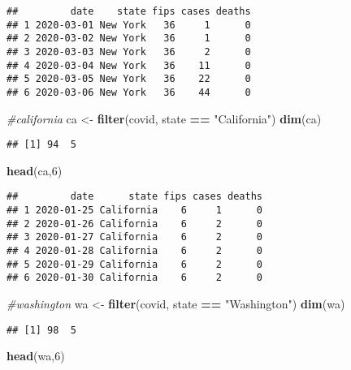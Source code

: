 \documentclass[]{article}
\newenvironment{Shaded}{\begin{snugshade}}{\end{snugshade}}
\newcommand{\CommentTok}[1]{\textcolor[rgb]{0.56,0.35,0.01}{\textit{#1}}}
\newcommand{\DecValTok}[1]{\textcolor[rgb]{0.00,0.00,0.81}{#1}}
\newcommand{\KeywordTok}[1]{\textcolor[rgb]{0.13,0.29,0.53}{\textbf{#1}}}
\newcommand{\NormalTok}[1]{#1}
\newcommand{\OperatorTok}[1]{\textcolor[rgb]{0.81,0.36,0.00}{\textbf{#1}}}
\newcommand{\StringTok}[1]{\textcolor[rgb]{0.31,0.60,0.02}{#1}}
\begin{document}
\begin{verbatim}
##         date    state fips cases deaths
## 1 2020-03-01 New York   36     1      0
## 2 2020-03-02 New York   36     1      0
## 3 2020-03-03 New York   36     2      0
## 4 2020-03-04 New York   36    11      0
## 5 2020-03-05 New York   36    22      0
## 6 2020-03-06 New York   36    44      0
\end{verbatim}

\begin{Shaded}
\begin{Highlighting}[]
\CommentTok{#california}
\NormalTok{ca <-}\StringTok{ }\KeywordTok{filter}\NormalTok{(covid, state }\OperatorTok{==}\StringTok{ "California"}\NormalTok{) }
\KeywordTok{dim}\NormalTok{(ca)}
\end{Highlighting}
\end{Shaded}

\begin{verbatim}
## [1] 94  5
\end{verbatim}

\begin{Shaded}
\begin{Highlighting}[]
\KeywordTok{head}\NormalTok{(ca,}\DecValTok{6}\NormalTok{)}
\end{Highlighting}
\end{Shaded}

\begin{verbatim}
##         date      state fips cases deaths
## 1 2020-01-25 California    6     1      0
## 2 2020-01-26 California    6     2      0
## 3 2020-01-27 California    6     2      0
## 4 2020-01-28 California    6     2      0
## 5 2020-01-29 California    6     2      0
## 6 2020-01-30 California    6     2      0
\end{verbatim}

\begin{Shaded}
\begin{Highlighting}[]
\CommentTok{#washington}
\NormalTok{wa <-}\StringTok{ }\KeywordTok{filter}\NormalTok{(covid, state }\OperatorTok{==}\StringTok{ "Washington"}\NormalTok{) }
\KeywordTok{dim}\NormalTok{(wa)}
\end{Highlighting}
\end{Shaded}

\begin{verbatim}
## [1] 98  5
\end{verbatim}

\begin{Shaded}
\begin{Highlighting}[]
\KeywordTok{head}\NormalTok{(wa,}\DecValTok{6}\NormalTok{)}
\end{Highlighting}
\end{Shaded}
\end{document}
